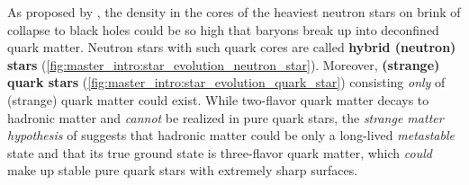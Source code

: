 As proposed by \cite{ref:quark_star_proposition_1,ref:quark_star_proposition_2},
the density in the cores of the heaviest neutron stars on brink of collapse to black holes could be so high 
that baryons break up into deconfined quark matter.
Neutron stars with such quark cores are called \textbf{hybrid (neutron) stars} (\cref{fig:master_intro:star_evolution_neutron_star}).
Moreover, \textbf{(strange) quark stars} (\cref{fig:master_intro:star_evolution_quark_star}) consisting \emph{only} of (strange) quark matter could exist.
While two-flavor quark matter decays to hadronic matter and \emph{cannot} be realized in pure quark stars,
the \emph{strange matter hypothesis} of \cite{ref:strange_hypothesis_bodmer,ref:strange_hypothesis_witten} suggests that
hadronic matter could be only a long-lived \emph{metastable} state and that its true ground state is three-flavor quark matter,
which \emph{could} make up stable pure quark stars
with extremely sharp surfaces. \cite{ref:glendenning}

